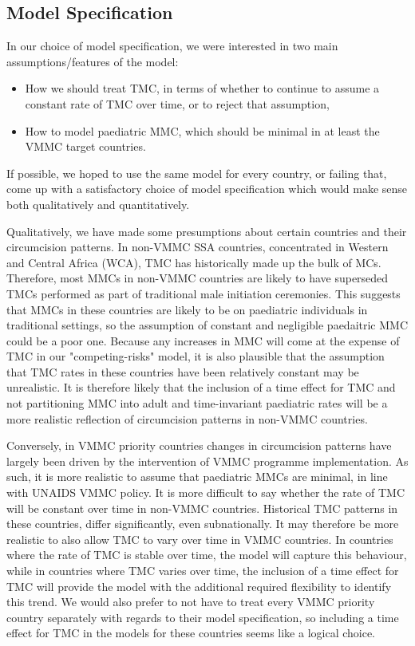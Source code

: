 \documentclass[a4paper, 12pt]{article}
\begin{document}
\subsection{Model Specification}
\label{sec:orgaf7fa2a}

In our choice of model specification, we were interested in two main assumptions/features of the
model:
\begin{itemize}
\item How we should treat TMC, in terms of whether to continue to assume a constant rate of TMC over time, or to reject that assumption,
\item How to model paediatric MMC, which should be minimal in at least the VMMC target countries.
\end{itemize}

If possible, we hoped to use the same model for every country, or failing that, come up with a
satisfactory choice of model specification which would make sense both qualitatively and
quantitatively. 

Qualitatively, we have made some presumptions about certain countries and their circumcision patterns.
In non-VMMC SSA countries, concentrated in Western and Central Africa (WCA), TMC has historically made up the bulk of MCs.
Therefore, most MMCs in non-VMMC countries are likely to have superseded TMCs performed as part of traditional male initiation ceremonies. This suggests that MMCs in these countries are likely to be on paediatric individuals in traditional settings, so the assumption of constant and
negligible paedaitric MMC could be a poor one. 
Because any increases in MMC will come at the expense of TMC in our "competing-risks" model, it is also plausible that the assumption that TMC rates in these countries have been relatively constant may be unrealistic.
It is therefore likely that the inclusion of a time effect for TMC and not partitioning MMC into adult and time-invariant paediatric rates will be a more realistic reflection of circumcision
patterns in non-VMMC countries.  

Conversely, in VMMC priority countries changes in circumcision patterns have largely been driven by the intervention of VMMC programme implementation. 
As such, it is more realistic to assume that paediatric MMCs are minimal, in line with UNAIDS VMMC policy.
It is more difficult to say whether the rate of TMC will be constant over time in non-VMMC countries.
Historical TMC patterns in these countries, differ significantly, even subnationally.
It may therefore be more realistic to also allow TMC to vary over time in VMMC countries.
In countries where the rate of TMC is stable over time, the model will capture this behaviour, while in countries where TMC varies over time, the inclusion of a time effect for TMC will provide the model with the additional required flexibility to identify this trend.
We would also prefer to not have to treat every VMMC priority country separately with regards to their model specification, so including a time effect for TMC in the models for these countries seems like a logical choice. 
\end{document}
